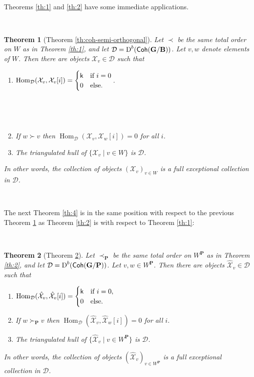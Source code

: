 \documentclass[sn-mathphys-num]{sn-jnl}%
\newcommand{\tX}{{\mathcal X}}
\newcommand{\D}{\mathcal D}
\newcommand*{\Dd}{\mathop{\mathrm D\kern0pt}\nolimits}
\newcommand*{\Hom}{\mathop{\mathrm {Hom}}\nolimits}
\newcommand*{\Coh}{\mathop{\sf {Coh}}\nolimits}
\newcommand{\sk}{{\sf k}}
\newcommand{\bg}{\mathbf G}
\newcommand{\fb}{\mathbf B}
\newcommand{\bp}{\mathbf P}
\def\text#1{\mbox{#1}}
\newtheorem{theorem}{Theorem}[section]
\theoremstyle{definition}
\begin{document}
\

Theorems \ref{th:1} and \ref{th:2} have some immediate applications. 

\

\begin{theorem}[Theorem \ref{th:coh-semi-orthogonal}]\label{th:3}
Let $\prec$ be the same total order on $W$ as in Theorem \ref{th:1}, 
and let $\D=\Dd^b (\Coh( \bg/\fb))$. Let $v,w$ denote elements of  $W$. Then there are objects $\tX_v\in \D$ such that 
\begin{enumerate}
\item $\Hom_\D(\tX_v,\tX_v[i])=\begin{cases}\sk &\text{if $i=0$}\\
0&\text{else.}\end{cases}$.

\

\

\item If $w\succ  v$ then $\Hom_\D(\tX_v,\tX_w[i])=0$ for all $i$.\\
\item The triangulated hull of $\{\tX_v\mid v \in W\}$ is $\D$.
\end{enumerate}
In other words, the collection of objects $(\tX_v)_{v \in W}$ is a full exceptional collection in $ \D$.
\end{theorem}

\

The next Theorem \ref{th:4} is in the same position with respect to the previous Theorem \ref{th:3} as Theorem \ref{th:2} is with respect to  Theorem \ref{th:1}: 

\

\begin{theorem}[Theorem \ref{th:Pcoh-semi-orthogonal}]\label{th:Pcoh-semi-orthogonal}\label{th:4}
Let $\prec _{\bp}$ be the same total order on $W^{\bp}$ as in Theorem \ref{th:2}, and let $\D=\Dd^b (\Coh( \bg/\bp))$. Let $v,w\in W^\bp$. Then there are objects $\hat \tX_v\in \D$ such that 
\begin{enumerate}
\item $\Hom_\D(\hat\tX_v,\hat\tX_v[i])=\begin{cases}\sk &\text{if $i=0$},\\
0&\text{else.}\end{cases}$\\



\item If $w\succ _{\bp}v$ then $\Hom_\D(\hat\tX_v,\hat\tX_w[i])=0$ for all $i$.\\
\item The triangulated hull of $\{\hat\tX_v\mid v \in W^\bp\}$ is $\D$.
\end{enumerate}
In other words, the collection of objects $(\hat\tX_v)_{v \in W^\bp}$ is a full exceptional collection in $ \D$.
\end{theorem}
\end{document}

